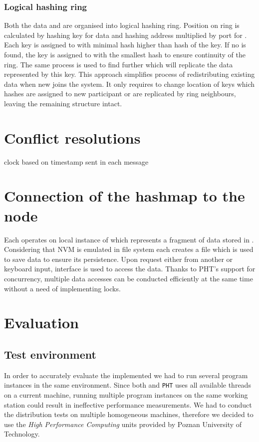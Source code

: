         \subsubsection{Logical hashing ring}
            Both the data and \Nodes are organised into logical hashing ring.
            Position on ring is calculated by hashing key for data and hashing address multiplied by port for \Nodes.
            Each key is assigned to \Node with minimal hash higher than hash of the key.
            If no \Node is found, the key is assigned to \Node with the smallest hash to ensure continuity of the ring.
            The same process is used to find further \Nodes which will replicate the data represented by this key.
            This approach simplifies process of redistributing existing data when new \Node joins the system.
            It only requires to change location of keys which hashes are assigned to new participant or are replicated by ring neighbours, leaving the remaining structure intact.
            
\section{Conflict resolutions}
    clock based on timestamp sent in each message
    

\section{Connection of the hashmap to the node}
    Each \Node operates on local instance of \PHT which represents a fragment of data stored in \DHTS.
    Considering that NVM is emulated in file system each \Node creates a file which is used to save data to ensure its persistence.
    Upon request either from another \Node or keyboard input, \PHT interface is used to access the data.
    Thanks to PHT's support for concurrency, multiple data accesses can be conducted efficiently at the same time without a need of implementing locks.
    

\section{Evaluation}

    \subsection{Test environment}
        In order to accurately evaluate the implemented \DHTS we had to run several program instances in the same environment.
        Since both \Node and \texttt{PHT} uses all available threads on a current machine, running multiple program instances on the same working station could result in ineffective performance measurements.
        We had to conduct the distribution tests on multiple homogeneous machines, therefore we decided to use the \textit{High Performance Computing} units provided by Poznan University of Technology. 
    
